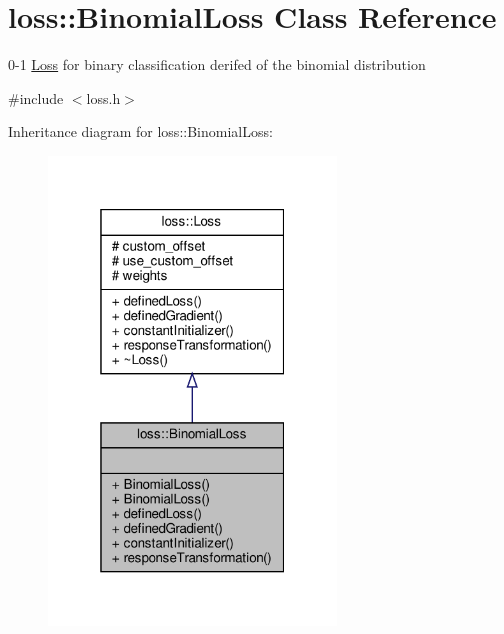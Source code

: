 \hypertarget{classloss_1_1_binomial_loss}{}\section{loss\+:\+:Binomial\+Loss Class Reference}
\label{classloss_1_1_binomial_loss}


0-\/1 \mbox{\hyperlink{classloss_1_1_loss}{Loss}} for binary classification derifed of the binomial distribution  




{\ttfamily \#include $<$loss.\+h$>$}



Inheritance diagram for loss\+:\+:Binomial\+Loss\+:\nopagebreak
\begin{figure}[H]
\begin{center}
\leavevmode
\includegraphics[width=217pt]{classloss_1_1_binomial_loss__inherit__graph}
\end{center}
\end{figure}


